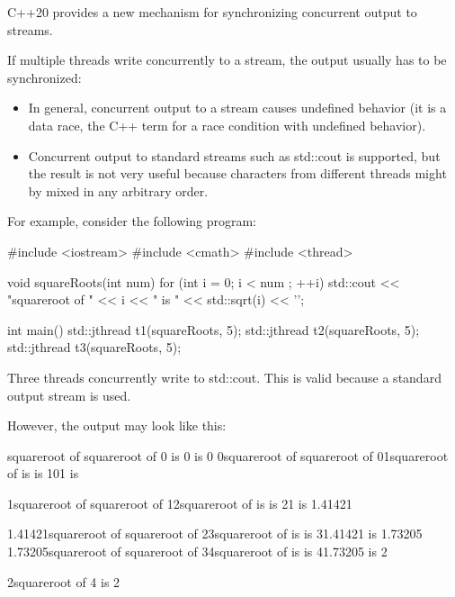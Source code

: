 

C++20 provides a new mechanism for synchronizing concurrent output to streams.


If multiple threads write concurrently to a stream, the output usually has to be synchronized:

\begin{itemize}
\item 
In general, concurrent output to a stream causes undefined behavior (it is a data race, the C++ term for a race condition with undefined behavior).

\item 
Concurrent output to standard streams such as std::cout is supported, but the result is not very useful because characters from different threads might by mixed in any arbitrary order.
\end{itemize}

For example, consider the following program:


\begin{cpp}
#include <iostream>
#include <cmath>
#include <thread>

void squareRoots(int num)
{
	for (int i = 0; i < num ; ++i) {
		std::cout << "squareroot of " << i << " is "
		<< std::sqrt(i) << '\n';
	}
}

int main()
{
	std::jthread t1(squareRoots, 5);
	std::jthread t2(squareRoots, 5);
	std::jthread t3(squareRoots, 5);
}	
\end{cpp}

Three threads concurrently write to std::cout. This is valid because a standard output stream is used.

However, the output may look like this:

\begin{shell}
squareroot of squareroot of 0 is 0 is 0
0squareroot of squareroot of
01squareroot of is is 101 is

1squareroot of squareroot of
12squareroot of is is 21 is 1.41421

1.41421squareroot of squareroot of
23squareroot of is is 31.41421 is 1.73205
1.73205squareroot of squareroot of
34squareroot of is is 41.73205 is 2

2squareroot of
4 is 2
\end{shell}



